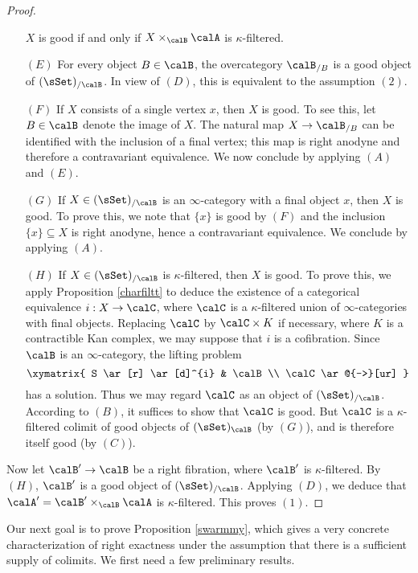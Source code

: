 \begin{proof}
\begin{itemize}
$X$ is good if and only if $X \times_{ \calB} \calA$ is $\kappa$-filtered.
\item[$(E)$] For every object $B \in \calB$, the overcategory $\calB_{/B}$ is a good
object of $(\sSet)_{/\calB}$. In view of $(D)$, this is equivalent to the assumption $(2)$.
\item[$(F)$] If $X$ consists of a single vertex $x$, then $X$ is good. To see this, let
$B \in \calB$ denote the image of $X$. The natural map $X \rightarrow \calB_{/B}$
can be identified with the inclusion of a final vertex; this map is right anodyne and therefore
a contravariant equivalence. We now conclude by applying $(A)$ and $(E)$.
\item[$(G)$] If $X \in (\sSet)_{/\calB}$ is an $\infty$-category with a final object $x$, then
$X$ is good. To prove this, we note that $\{x\}$ is good by $(F)$ and the inclusion
$\{x\} \subseteq X$ is right anodyne, hence a contravariant equivalence. We conclude by applying $(A)$.
\item[$(H)$] If $X \in (\sSet)_{/\calB}$ is $\kappa$-filtered, then $X$ is good. To prove this, we apply
Proposition \ref{charfiltt} to deduce the existence of a categorical equivalence $i:X \rightarrow \calC$, where $\calC$ is a $\kappa$-filtered union of $\infty$-categories with final objects. Replacing $\calC$ by $\calC \times K$ if necessary, where $K$ is a contractible Kan complex, we may suppose that $i$ is a cofibration. Since $\calB$ is an $\infty$-category, the lifting problem
$$ \xymatrix{ S \ar[r] \ar[d]^{i} & \calB \\
\calC \ar@{-->}[ur] }$$
has a solution. Thus we may regard $\calC$ as an object of $(\sSet)_{/\calB}$.
According to $(B)$, it suffices to show that $\calC$ is good. But $\calC$ is a $\kappa$-filtered
colimit of good objects of $(\sSet)_{\calB}$ (by $(G)$), and is therefore itself good (by $(C)$).
\end{itemize}

Now let $\calB' \rightarrow \calB$ be a right fibration, where $\calB'$ is $\kappa$-filtered.
By $(H)$, $\calB'$ is a good object of $(\sSet)_{/\calB}$. Applying $(D)$, we deduce that
$\calA' = \calB' \times_{\calB} \calA$ is $\kappa$-filtered. This proves $(1)$.
\end{proof}

Our next goal is to prove Proposition \ref{swarmmy}, which gives a very concrete characterization of right exactness under the assumption that there is a sufficient supply of colimits. We first need a few preliminary results.

